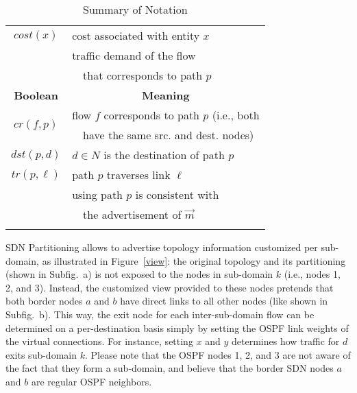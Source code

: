 \documentclass[journal]{IEEEtran}
\begin{document}
\begin{table}[h]
\begin{center}
\begin{tabular}{ c l }
$cost(x)$ & cost associated with entity $x$ \\\addlinespace[1.0mm]
\multirow{2}{*}{$dm(p)$} & traffic demand of the flow \\
 & $\text{ }$ that corresponds to path $p$ \\\addlinespace[1.0mm]
\midrule
\textbf{Boolean} & \multicolumn{1}{c}{\textbf{Meaning}} \\
\midrule
\multirow{2}{*}{$cr(f,p)$} & flow $f$ corresponds to path $p$ (i.e., both \\
 & $\text{ }$ have the same src. and dest. nodes) \\\addlinespace[1.0mm]
$dst(p,d)$ & $d\in N$ is the destination of path $p$ \\\addlinespace[1.0mm]
$tr(p,\ell)$ & path $p$ traverses link $\ell$ \\\addlinespace[1.0mm]
\multirow{2}{*}{$cons(p,\vec{m})$} & using path $p$ is consistent with \\
 & $\text{ }$ the advertisement of $\vec{m}$ \\\addlinespace[1.0mm]
\bottomrule
\end{tabular}\normalsize
\caption{Summary of Notation}\label{netwsymbls}
\end{center}\end{table}


SDN Partitioning allows to advertise topology information customized per sub-domain, as illustrated in Figure~\ref{view}: the original topology and its partitioning (shown in Subfig.~a) is not exposed to the nodes in sub-domain $k$ (i.e., nodes 1, 2, and 3). Instead, the customized view provided to these nodes pretends that both border nodes $a$ and $b$ have direct links to all other nodes (like shown in Subfig.~b). This way, the exit node for each inter-sub-domain flow can be determined on a per-destination basis simply by setting the OSPF link weights of the virtual connections. For instance, setting $x$ and $y$ determines how traffic for $d$ exits sub-domain $k$. Please note that the OSPF nodes 1, 2, and 3 are not aware of the fact that they form a sub-domain, and believe that the border SDN nodes $a$ and $b$ are regular OSPF neighbors.
\end{document}
